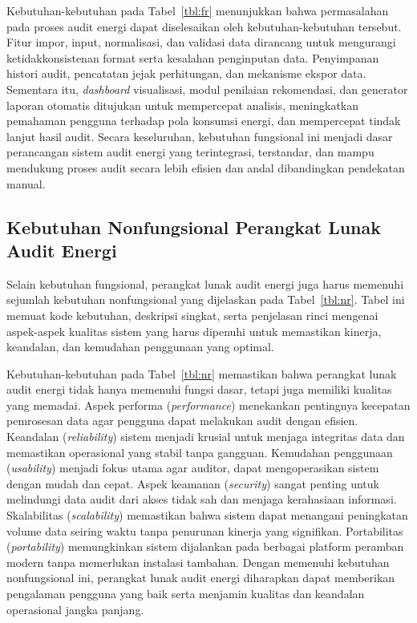 Kebutuhan-kebutuhan pada Tabel~\ref{tbl:fr} menunjukkan bahwa permasalahan pada proses audit energi dapat diselesaikan oleh kebutuhan-kebutuhan tersebut. Fitur impor, input, normalisasi, dan validasi data dirancang untuk mengurangi ketidakkonsistenan format serta kesalahan penginputan data. Penyimpanan histori audit, pencatatan jejak perhitungan, dan mekanisme ekspor data. Sementara itu, \textit{dashboard} visualisasi, modul penilaian rekomendasi, dan generator laporan otomatis ditujukan untuk mempercepat analisis, meningkatkan pemahaman pengguna terhadap pola konsumsi energi, dan mempercepat tindak lanjut hasil audit. Secara keseluruhan, kebutuhan fungsional ini menjadi dasar perancangan sistem audit energi yang terintegrasi, terstandar, dan mampu mendukung proses audit secara lebih efisien dan andal dibandingkan pendekatan manual.

\subsection{Kebutuhan Nonfungsional Perangkat Lunak Audit Energi}
Selain kebutuhan fungsional, perangkat lunak audit energi juga harus memenuhi sejumlah kebutuhan nonfungsional yang dijelaskan pada Tabel~\ref{tbl:nr}. Tabel ini memuat kode kebutuhan, deskripsi singkat, serta penjelasan rinci mengenai aspek-aspek kualitas sistem yang harus dipenuhi untuk memastikan kinerja, keandalan, dan kemudahan penggunaan yang optimal.



Kebutuhan-kebutuhan pada Tabel~\ref{tbl:nr} memastikan bahwa perangkat lunak audit energi tidak hanya memenuhi fungsi dasar, tetapi juga memiliki kualitas yang memadai. Aspek performa (\textit{performance}) menekankan pentingnya kecepatan pemrosesan data agar pengguna dapat melakukan audit dengan efisien. Keandalan (\textit{reliability}) sistem menjadi krusial untuk menjaga integritas data dan memastikan operasional yang stabil tanpa gangguan. Kemudahan penggunaan (\textit{usability}) menjadi fokus utama agar auditor, dapat mengoperasikan sistem dengan mudah dan cepat. Aspek keamanan (\textit{security}) sangat penting untuk melindungi data audit dari akses tidak sah dan menjaga kerahasiaan informasi. Skalabilitas (\textit{scalability}) memastikan bahwa sistem dapat menangani peningkatan volume data seiring waktu tanpa penurunan kinerja yang signifikan. Portabilitas (\textit{portability}) memungkinkan sistem dijalankan pada berbagai platform peramban modern tanpa memerlukan instalasi tambahan. Dengan memenuhi kebutuhan nonfungsional ini, perangkat lunak audit energi diharapkan dapat memberikan pengalaman pengguna yang baik serta menjamin kualitas dan keandalan operasional jangka panjang.

